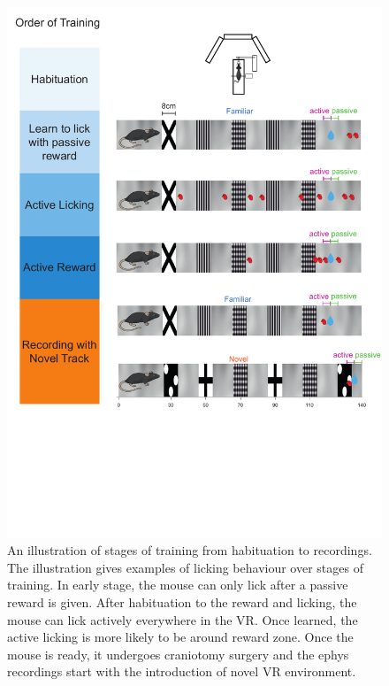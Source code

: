 \begin{figure}
    \centering
    \includegraphics[width=1\linewidth]{figures//Chapter 3 Behaviour//Thesis Figures//figure_PDFs/fig1_behaviour_training.pdf}
    \caption{An illustration of stages of training from habituation to recordings. The illustration gives examples of licking behaviour over stages of training. In early stage, the mouse can only lick after a passive reward is given. After habituation to the reward and licking, the mouse can lick actively everywhere in the VR. Once learned, the active licking is more likely to be around reward zone. Once the mouse is ready, it undergoes craniotomy surgery and the ephys recordings start with the introduction of novel VR environment.}
    \label{fig:placeholder}
\end{figure}


